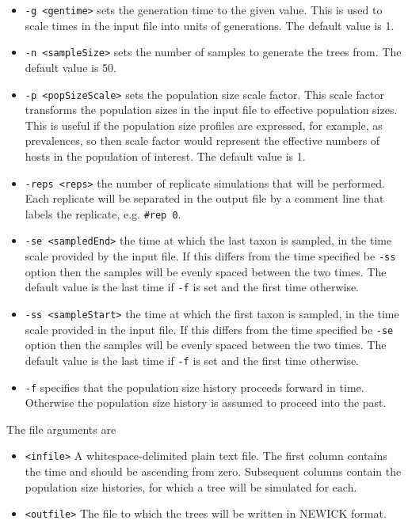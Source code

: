 \documentclass[12pt]{article}
\begin{document}
\begin{itemize}
\item \texttt{-g <gentime>}  sets the generation time to the given value. This is used to scale times in the input file into units of generations. The default value is 1.

\item \texttt{-n <sampleSize>} sets the number of samples to generate the trees from. The default value is 50.

\item \texttt{-p <popSizeScale>}   sets the population size scale factor. This scale factor transforms the population sizes in the input  file to effective population sizes. This is useful if the population size profiles are expressed, for example, as prevalences, so then scale factor would represent the effective numbers of hosts in the population of interest. The default value is 1.
 
\item \texttt{-reps <reps>} the number of replicate simulations that will be performed. Each replicate will be separated in the output file by a comment line that labels the replicate, e.g. \texttt{\#rep 0}.
 
\item \texttt{-se <sampledEnd>}  the time at which the last taxon is sampled, in the time scale provided by the input file. If this differs from the time specified be \texttt{-ss} option then the samples will be evenly spaced between the two times. The default value is the last time if \texttt{-f} is set and the first time otherwise.
 
\item \texttt{-ss <sampleStart>}  the time at which the first taxon is sampled, in the time scale provided in the input file. If this differs from the time specified be \texttt{-se} option then the samples will be evenly spaced between the two times. The default value is the last time if \texttt{-f} is set and the first time otherwise.

\item \texttt{-f} specifies that the population size history proceeds forward in time. Otherwise the population size history is assumed to proceed into the past.
\end{itemize}

The file arguments are

\begin{itemize}
\item \texttt{<infile>}  A whitespace-delimited plain text file. The first column contains the time and should be ascending from zero. Subsequent columns contain the population size histories, for which a tree will be simulated for each.
\item \texttt{<outfile>} The file to which the trees will be written in NEWICK format.
\end{itemize}
\end{document}
